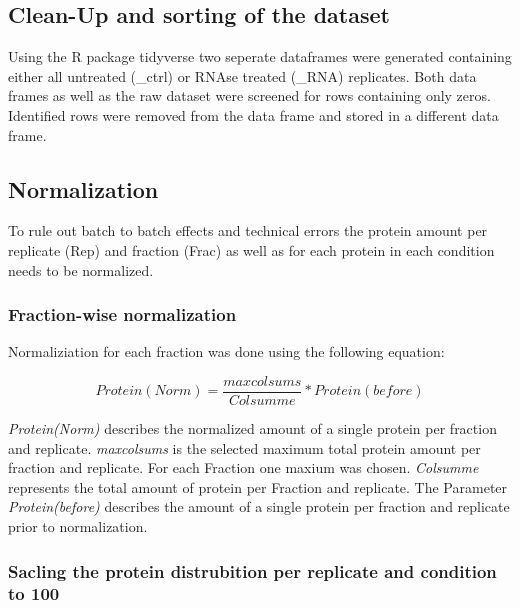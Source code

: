 \documentclass[
]{article}
\begin{document}
\hypertarget{clean-up-and-sorting-of-the-dataset}{%
\subsection{Clean-Up and sorting of the
dataset}\label{clean-up-and-sorting-of-the-dataset}}

Using the R package tidyverse two seperate dataframes were generated
containing either all untreated (\_ctrl) or RNAse treated (\_RNA)
replicates. Both data frames as well as the raw dataset were screened
for rows containing only zeros. Identified rows were removed from the
data frame and stored in a different data frame.

\hypertarget{normalization}{%
\subsection{Normalization}\label{normalization}}

To rule out batch to batch effects and technical errors the protein
amount per replicate (Rep) and fraction (Frac) as well as for each
protein in each condition needs to be normalized.

\hypertarget{fraction-wise-normalization}{%
\subsubsection{Fraction-wise
normalization}\label{fraction-wise-normalization}}

Normaliziation for each fraction was done using the following equation:

\[Protein(Norm) = \frac{maxcolsums}{Colsumme} * Protein(before)\]

\emph{Protein(Norm)} describes the normalized amount of a single protein
per fraction and replicate. \emph{maxcolsums} is the selected maximum
total protein amount per fraction and replicate. For each Fraction one
maxium was chosen. \emph{Colsumme} represents the total amount of
protein per Fraction and replicate. The Parameter \emph{Protein(before)}
describes the amount of a single protein per fraction and replicate
prior to normalization.

\hypertarget{sacling-the-protein-distrubition-per-replicate-and-condition-to-100}{%
\subsubsection{Sacling the protein distrubition per replicate and
condition to
100}\label{sacling-the-protein-distrubition-per-replicate-and-condition-to-100}}
\end{document}
